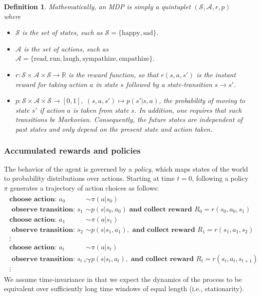 \documentclass[10pt,letterpaper]{article}
\newtheorem*{definition*}{Definition}
\begin{document}
\begin{definition*}
Mathematically, an MDP is simply a quintuplet $(\mathcal S, \mathcal A, r, p)$ where
\begin{itemize}
\item $\mathcal S$ is the set of states, such as $\mathcal S = \{\text{happy}, \text{sad}\}$.
\item $\mathcal A$ is the set of actions, such as $\mathcal A = \{\text{read}, \text{run},
  \text{laugh}, \text{sympathize}, \text{empathize}\}.$
\item $r : \mathcal S \times \mathcal A \times \mathcal S \rightarrow \mathbb R$ is the \textit{reward function},
   so that $r(s, a, s')$ is the instant reward for taking action $a$ in state $s$ followed by a state-transition $s \rightarrow s'$.
\item $p : \mathcal S \times \mathcal A \times \mathcal S \rightarrow [0, 1],\; (s,a,s') \mapsto p(s'|s,a)$,
  the probability of moving to state $s'$ if action $a$ is taken from state $s$. In addition, one requires that such
  transitions be Markovian. Consequently, the future states are independent of past states and only depend on the present state and action taken.

\end{itemize}

\end{definition*}


\subsubsection{Accumulated rewards and policies}
The behavior of the agent is governed by a \textit{policy}, which maps states of the world
to probability distributions over actions.
Starting at time $t=0$,
following a policy $\pi$ generates a trajectory of action choices as follows:
\begin{eqnarray*}
  \begin{split}
    \textbf{choose action: }a_0 &\sim \pi(a|s_0)\\
    \textbf{ observe transition: }s_1 &\sim p(s|s_0,a_0)\textbf{ and collect reward }R_0 = r(s_0, a_0, s_1)\\
    \textbf{choose action: }a_1 &\sim \pi(a|s_1)\\
    \textbf{ observe transition: }s_2 &\sim p(s|s_1,a_1), \textbf{ and collect reward }R_1 = r(s_1, a_1,s_2)\\
    \vdots\\
    \textbf{choose action: }a_{t} &\sim \pi(a|s_{t})\\
    \textbf{ observe transition: }s_{t+1} &\sim p(s|s_{t},a_{t}), \textbf{ and collect reward }R_{t} = r(s_{t}, a_{t},s_{t+1})\\
    \vdots
  \end{split}
\end{eqnarray*}
We assume time-invariance
in that we expect the dynamics of the process
to be equivalent over sufficiently long time windows of equal length (i.e., stationarity).
\end{document}
